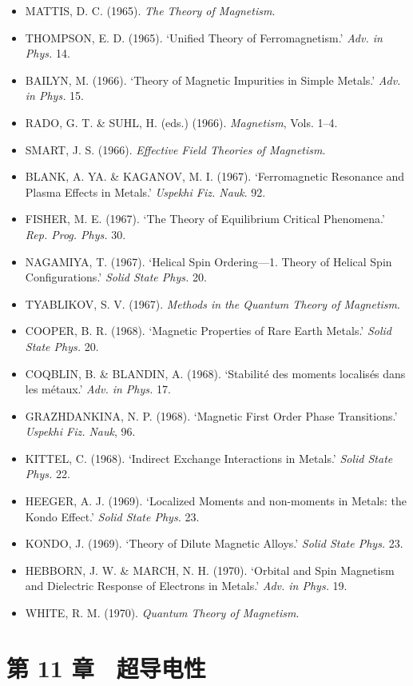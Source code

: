 \begin{itemize}[leftmargin=2em, itemsep=0.2em]
\item MATTIS, D. C. (1965). \emph{The Theory of Magnetism}.
\item THOMPSON, E. D. (1965). `Unified Theory of Ferromagnetism.' \emph{Adv. in Phys.} 14.
\item BAILYN, M. (1966). `Theory of Magnetic Impurities in Simple Metals.' \emph{Adv. in Phys.} 15.
\item RADO, G. T. \& SUHL, H. (eds.) (1966). \emph{Magnetism}, Vols. 1--4.
\item SMART, J. S. (1966). \emph{Effective Field Theories of Magnetism}.
\item BLANK, A. YA. \& KAGANOV, M. I. (1967). `Ferromagnetic Resonance and Plasma Effects in Metals.' \emph{Uspekhi Fiz. Nauk}. 92.
\item FISHER, M. E. (1967). `The Theory of Equilibrium Critical Phenomena.' \emph{Rep. Prog. Phys.} 30.
\item NAGAMIYA, T. (1967). `Helical Spin Ordering---1. Theory of Helical Spin Configurations.' \emph{Solid State Phys.} 20.
\item TYABLIKOV, S. V. (1967). \emph{Methods in the Quantum Theory of Magnetism}.
\item COOPER, B. R. (1968). `Magnetic Properties of Rare Earth Metals.' \emph{Solid State Phys.} 20.
\item COQBLIN, B. \& BLANDIN, A. (1968). `Stabilité des moments localisés dans les métaux.' \emph{Adv. in Phys.} 17.
\item GRAZHDANKINA, N. P. (1968). `Magnetic First Order Phase Transitions.' \emph{Uspekhi Fiz. Nauk}, 96.
\item KITTEL, C. (1968). `Indirect Exchange Interactions in Metals.' \emph{Solid State Phys.} 22.
\item HEEGER, A. J. (1969). `Localized Moments and non-moments in Metals: the Kondo Effect.' \emph{Solid State Phys.} 23.
\item KONDO, J. (1969). `Theory of Dilute Magnetic Alloys.' \emph{Solid State Phys.} 23.
\item HEBBORN, J. W. \& MARCH, N. H. (1970). `Orbital and Spin Magnetism and Dielectric Response of Electrons in Metals.' \emph{Adv. in Phys.} 19.
\item WHITE, R. M. (1970). \emph{Quantum Theory of Magnetism}.
\end{itemize}

\section*{第 11 章　超导电性}

